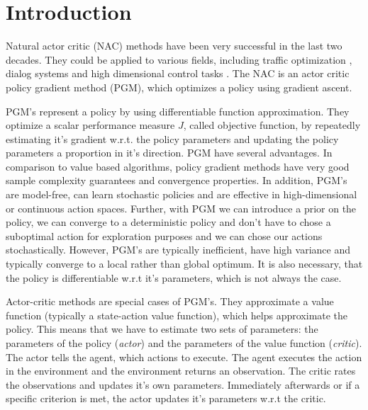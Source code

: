 \section{Introduction}
\label{sec:intro}

Natural actor critic (NAC) methods \citep{peters2005natural} have been very successful in the last two decades. They could be applied to various fields, including traffic optimization \citep{richter2007natural}, dialog systems \citep{jurvcivcek2011natural} and high dimensional control tasks \citep{kim2010impedance, park2005rls, peters2007applying, peters2008natural, peters2008reinforcement, peters2003reinforcement}. The NAC is an actor critic policy gradient method (PGM), which optimizes a policy using gradient ascent.

PGM's represent a policy by using differentiable function approximation. They optimize a scalar performance measure $J$, called objective function, by repeatedly estimating it's gradient w.r.t. the policy parameters and updating the policy parameters a proportion in it's direction. PGM have several advantages. In comparison to value based algorithms, policy gradient methods have very good sample complexity guarantees \cite{nemirovski2005efficient} and convergence properties. In addition, PGM's are model-free, can learn stochastic policies and are effective in high-dimensional or continuous action spaces. Further, with PGM we can introduce a prior on the policy, we can converge to a deterministic policy and don't have to chose a suboptimal action for exploration purposes and we can chose our actions stochastically. However, PGM's are typically inefficient, have high variance and typically converge to a local rather than global optimum. It is also necessary, that the policy is differentiable w.r.t it's parameters, which is not always the case.

Actor-critic methods are special cases of PGM's. They approximate a value function (typically a state-action value function), which helps approximate the policy. This means that we have to estimate two sets of parameters: the parameters of the policy (\textit{actor}) and the parameters of the value function (\textit{critic}). The actor tells the agent, which actions to execute. The agent executes the action in the environment and the environment returns an observation. The critic rates the observations and updates it's own parameters. Immediately afterwards or if a specific criterion is met, the actor updates it's parameters w.r.t the critic.

